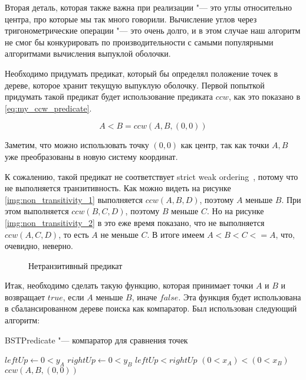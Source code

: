 Вторая деталь, которая также важна при реализации "--- это углы относительно центра, про которые мы так много говорили. Вычисление углов через тригонометрические операции "--- это очень долго, и в этом случае наш алгоритм не смог бы конкурировать по производительности с самыми популярными алгоритмами вычисления выпуклой оболочки.

Необходимо придумать предикат, который бы определял положение точек в дереве, которое хранит текущую выпуклую оболочку. Первой попыткой придумать такой предикат будет использование предиката $ccw$, как это показано в \eqref{eq:my_ccw_predicate}.

\begin{equation}\label{eq:my_ccw_predicate}
A<B=ccw(A, B, (0, 0))
\end{equation}

Заметим, что можно использовать точку $(0, 0)$ как центр, так как точки $A, B$ уже преобразованы в новую систему координат.

К сожалению, такой предикат не соответствует strict weak ordering~\cite{isoCppStd2017}, потому что не выполняется транзитивность. Как можно видеть на рисунке \ref{img:non_transitivity_1} выполняется $ccw(A, B, D)$, поэтому $A$ меньше $B$. При этом выполняется $ccw(B, C, D)$, поэтому $B$ меньше $C$. Но на рисунке \ref{img:non_transitivity_2} в это еже время показано, что не выполняется $ccw(A, C, D)$, то есть $A$ не меньше $C$. В итоге имеем $A < B < C <= A$, что, очевидно, неверно.

\begin{figure}[hbt]
	{\centering
		\hfill
		\subbottom[\label{img:non_transitivity_1}]{%
			}
		\hfill
		\subbottom[\label{img:non_transitivity_2}]{%
			}
		\hfill
	}
	\caption{Нетранзитивный предикат}
	\label{img:non_transitivity}
\end{figure}

Итак, необходимо сделать такую функцию, которая принимает точки $A$ и $B$ и возвращает $true$, если $A$ меньше $B$, иначе $false$. Эта функция будет использована в сбалансированном дереве поиска как компаратор. Был использован следующий алгоритм:

\begin{algorithm}[H]
	\caption{BSTPredicate "--- компаратор для сравнения точек}
	\label{alg:bst_predicate}
	\begin{algorithmic}[1]
		\State $leftUp \gets 0<y_A$
		\State $rightUp \gets 0<y_B$
			\Return $leftUp < rightUp$
		\EndIf
			\Return $(0<x_A) < (0<x_B)$
		\EndIf
		\Return $ccw(A, B, (0, 0))$
		\EndProcedure
	\end{algorithmic}
\end{algorithm}

